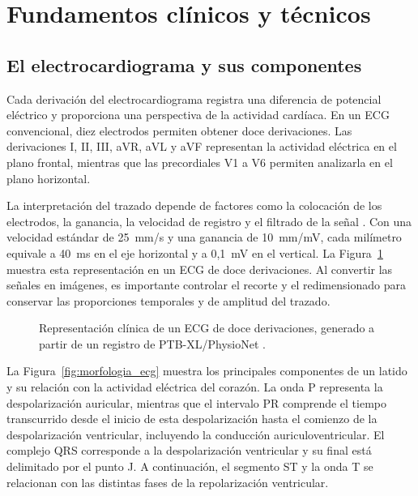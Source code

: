 \section{Fundamentos clínicos y técnicos}
\label{chap:fundamentos}

\subsection{El electrocardiograma y sus componentes}
\label{sec:componentes_ecg}

Cada derivación del electrocardiograma registra una diferencia de potencial eléctrico y proporciona una perspectiva de la actividad cardíaca. En un ECG convencional, diez electrodos permiten obtener doce derivaciones. Las derivaciones I, II, III, aVR, aVL y aVF representan la actividad eléctrica en el plano frontal, mientras que las precordiales V1 a V6 permiten analizarla en el plano horizontal.

La interpretación del trazado depende de factores como la colocación de los electrodos, la ganancia, la velocidad de registro y el filtrado de la señal \cite{kligfield2007}. Con una velocidad estándar de 25~mm/s y una ganancia de 10~mm/mV, cada milímetro equivale a 40~ms en el eje horizontal y a 0,1~mV en el vertical. La Figura~\ref{fig:signal_to_image} muestra esta representación en un ECG de doce derivaciones. Al convertir las señales en imágenes, es importante controlar el recorte y el redimensionado para conservar las proporciones temporales y de amplitud del trazado.

\begin{figure}[H]
  \centering
  \caption{Representación clínica de un ECG de doce derivaciones, generado a partir de un registro de PTB-XL/PhysioNet \cite{wagner2020}.}
  \label{fig:signal_to_image}
\end{figure}

La Figura~\ref{fig:morfologia_ecg} muestra los principales componentes de un latido y su relación con la actividad eléctrica del corazón. La onda P representa la despolarización auricular, mientras que el intervalo PR comprende el tiempo transcurrido desde el inicio de esta despolarización hasta el comienzo de la despolarización ventricular, incluyendo la conducción auriculoventricular. El complejo QRS corresponde a la despolarización ventricular y su final está delimitado por el punto J. A continuación, el segmento ST y la onda T se relacionan con las distintas fases de la repolarización ventricular.


